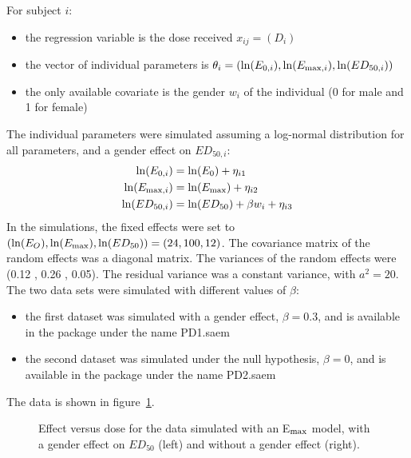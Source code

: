 {For subject $i$:
\begin{itemize}
\item the regression variable is the dose received $x_{ij} = (D_i)$
\item the vector of individual parameters is $\theta_i = \left(\ln(E_{0,i}), \ln(E_{{\rm max},i}), \ln(ED_{50,i}) \right)$
\item the only available covariate is the gender $w_i$ of the individual (0 for male and 1 for female)
\end{itemize}
The individual parameters were simulated assuming a log-normal distribution for all parameters, and a gender effect on $ED_{50,i}$:
\begin{equation}
\begin{split}
\ln(E_{0,i}) &= \ln(E_{0}) + \eta_{i1} \\
\ln(E_{{\rm max},i}) &= \ln(E_{\rm max}) + \eta_{i2} \\
\ln(ED_{50,i}) &= \ln(ED_{50}) + \beta w_i + \eta_{i3} \\
\end{split}
\end{equation}
In the simulations, the fixed effects were set to $\left(\ln(E_{O}), \ln(E_{{\rm max}}), \ln(ED_{50}) \right)=(24 , 100 , 12)$. The covariance matrix of the random effects was a diagonal matrix. The variances of the random effects were (0.12 , 0.26 , 0.05). The residual variance was a constant variance, with $a^2 = 20$. The two data sets were simulated with different values of $\beta$:
\begin{itemize}
\item the first dataset was simulated with a gender effect, $\beta=0.3$, and is available in the package under the name {\sf PD1.saem}
\item the second dataset was simulated under the null hypothesis, $\beta=0$, and is available in the package under the name {\sf PD2.saem}
\end{itemize}

The data is shown in figure~\ref{fig:PDdata}.

\begin{figure}[!h]
\begin{center}
\par \kern -1cm
\end{center}
\par \kern -0.5cm
\caption{Effect versus dose for the data simulated with an E$_{\rm max}$ model, with a gender effect on $ED_{50}$ (left) and without a gender effect (right).} \label{fig:PDdata}
\end{figure}

}
